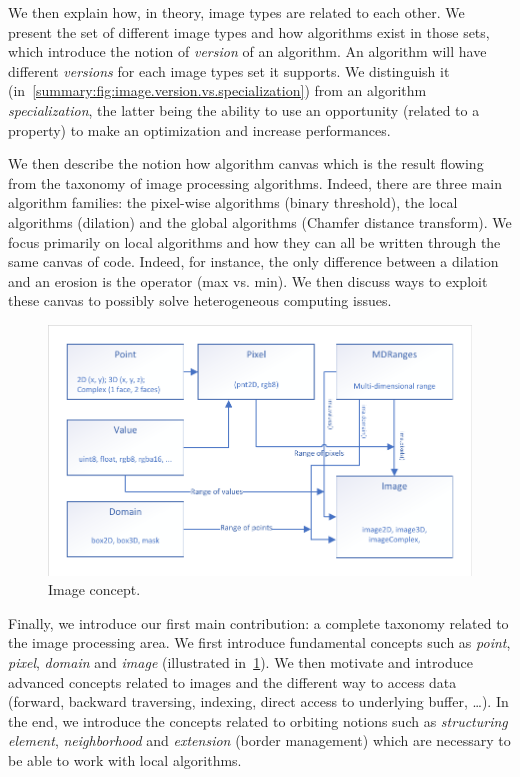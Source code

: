 We then explain how, in theory, image types are related to each other. We present the set of different image types and
how algorithms exist in those sets, which introduce the notion of \emph{version} of an algorithm. An algorithm will have
different \emph{versions} for each image types set it supports. We distinguish it
(in~\cref{summary:fig:image.version.vs.specialization}) from an algorithm \emph{specialization}, the latter being the
ability to use an opportunity (related to a property) to make an optimization and increase performances.

We then describe the notion how algorithm canvas which is the result flowing from the taxonomy of image processing
algorithms. Indeed, there are three main algorithm families: the pixel-wise algorithms (binary threshold), the local
algorithms (dilation) and the global algorithms (Chamfer distance transform). We focus primarily on local algorithms and
how they can all be written through the same canvas of code. Indeed, for instance, the only difference between a
dilation and an erosion is the operator (max vs. min). We then discuss ways to exploit these canvas to possibly solve
heterogeneous computing issues.

\begin{figure}[htbp]
  \centering
  \includegraphics[width=.8\linewidth]{../figures/concepts/image}
  \caption[]{Image concept.}
  \label{summary:fig:concept.image}
\end{figure}

Finally, we introduce our first main contribution: a complete taxonomy related to the image processing area. We first
introduce fundamental concepts such as \emph{point}, \emph{pixel}, \emph{domain} and \emph{image} (illustrated
in~\cref{summary:fig:concept.image}). We then motivate and introduce advanced concepts related to images and the
different way to access data (forward, backward traversing, indexing, direct access to underlying buffer, \ldots). In
the end, we introduce the concepts related to orbiting notions such as \emph{structuring element}, \emph{neighborhood}
and \emph{extension} (border management) which are necessary to be able to work with local algorithms.

